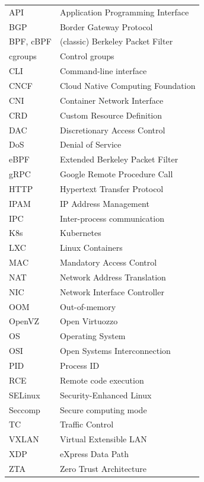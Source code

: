 \documentclass[english, 12pt, a4paper, sci, utf8, a-2b, online]{aaltothesis}
\begin{document}
\begin{tabular}{ll}
  API         & Application Programming Interface   \\
  BGP         & Border Gateway Protocol             \\
  BPF, cBPF   & (classic) Berkeley Packet Filter    \\
  cgroups     & Control groups                      \\
  CLI         & Command-line interface              \\
  CNCF        & Cloud Native Computing Foundation   \\
  CNI         & Container Network Interface         \\
  CRD         & Custom Resource Definition          \\
  DAC         & Discretionary Access Control        \\
  DoS         & Denial of Service                   \\
  eBPF        & Extended Berkeley Packet Filter     \\
  gRPC        & Google Remote Procedure Call        \\
  HTTP        & Hypertext Transfer Protocol         \\
  IPAM        & IP Address Management               \\
  IPC         & Inter-process communication         \\
  K8s         & Kubernetes                          \\
  LXC         & Linux Containers                    \\
  MAC         & Mandatory Access Control            \\
  NAT         & Network Address Translation         \\
  NIC         & Network Interface Controller        \\
  OOM         & Out-of-memory                       \\
  OpenVZ      & Open Virtuozzo                      \\
  OS          & Operating System                    \\
  OSI         & Open Systems Interconnection        \\
  PID         & Process ID                          \\
  RCE         & Remote code execution               \\
  SELinux     & Security-Enhanced Linux             \\
  Seccomp     & Secure computing mode               \\
  TC          & Traffic Control                     \\
  VXLAN       & Virtual Extensible LAN              \\
  XDP         & eXpress Data Path                   \\
  ZTA         & Zero Trust Architecture             \\
\end{tabular}
\end{document}
